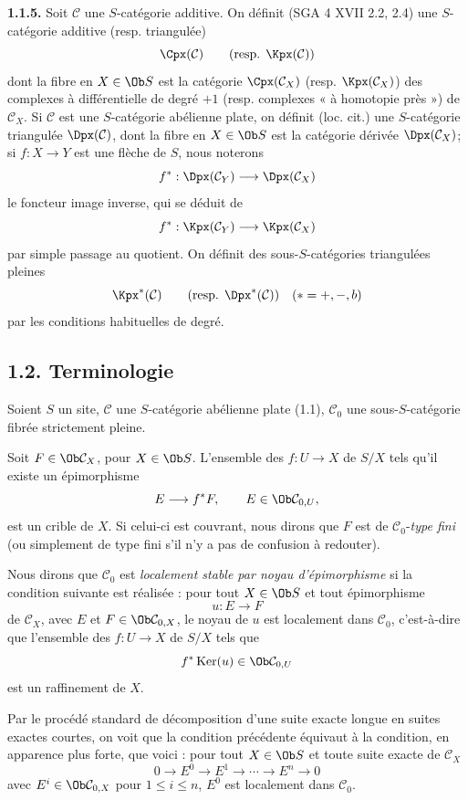 \documentclass[11pt]{article}
\providecommand{\Ker}{\operatorname{Ker}}
\begin{document}
\textbf{1.1.5.} Soit \(\mathcal C\) une \(S\)-catégorie additive. On définit (SGA 4 XVII 2.2, 2.4) une \(S\)-catégorie additive (resp. triangulée)
\[
  \Cpx(\mathcal C)\qquad\text{(resp. }\Kpx(\mathcal C)\text{)}
\]
dont la fibre en \(X\in\Ob S\) est la catégorie \(\Cpx(\mathcal C_X)\) (resp. \(\Kpx(\mathcal C_X)\)) des complexes à différentielle de degré \(+1\) (resp. complexes « à homotopie près ») de \(\mathcal C_X\). Si \(\mathcal C\) est une \(S\)-catégorie abélienne plate, on définit (loc. cit.) une \(S\)-catégorie triangulée \(\Dpx(\mathcal C)\), dont la fibre en \(X\in\Ob S\) est la catégorie dérivée \(\Dpx(\mathcal C_X)\); si \(f:X\to Y\) est une flèche de \(S\), nous noterons
\[
  f^*:\Dpx(\mathcal C_Y)\longrightarrow \Dpx(\mathcal C_X)
\]
le foncteur image inverse, qui se déduit de
\[
  f^*:\Kpx(\mathcal C_Y)\longrightarrow \Kpx(\mathcal C_X)
\]
par simple passage au quotient. On définit des sous-\(S\)-catégories triangulées pleines
\[
  \Kpx^*(\mathcal C)\qquad\text{(resp. }\Dpx^*(\mathcal C)\text{)}
  \quad (*=+,-,b)
\]
par les conditions habituelles de degré.

\subsection*{1.2. Terminologie}

Soient \(S\) un site, \(\mathcal C\) une \(S\)-catégorie abélienne plate (1.1), \(\mathcal C_0\) une sous-\(S\)-catégorie fibrée strictement pleine.

Soit \(F\in\Ob\mathcal C_X\), pour \(X\in\Ob S\). L'ensemble des \(f:U\to X\) de \(S/X\) tels qu'il existe un épimorphisme
\[
  E\longrightarrow f^*F,\qquad E\in\Ob\mathcal C_{0,U},
\]
est un crible de \(X\). Si celui-ci est couvrant, nous dirons que \(F\) est de \(\mathcal C_0\)-\emph{type fini} (ou simplement de type fini s'il n'y a pas de confusion à redouter).

Nous dirons que \(\mathcal C_0\) est \emph{localement stable par noyau d'épimorphisme} si la condition suivante est réalisée : pour tout \(X\in\Ob S\) et tout épimorphisme
\[
  u:E\longrightarrow F
\]
de \(\mathcal C_X\), avec \(E\) et \(F\in\Ob\mathcal C_{0,X}\), le noyau de \(u\) est localement dans \(\mathcal C_0\), c'est-à-dire que l'ensemble des \(f:U\to X\) de \(S/X\) tels que
\[
  f^*\Ker(u)\in\Ob\mathcal C_{0,U}
\]
est un raffinement de \(X\).

Par le procédé standard de décomposition d'une suite exacte longue en suites exactes courtes, on voit que la condition précédente équivaut à la condition, en apparence plus forte, que voici : pour tout \(X\in\Ob S\) et toute suite exacte de \(\mathcal C_X\)
\begin{equation}\tag{*}
  0\longrightarrow E^0\longrightarrow E^1\longrightarrow\cdots\longrightarrow E^n\longrightarrow 0
\end{equation}
avec \(E^i\in\Ob\mathcal C_{0,X}\) pour \(1\leq i\leq n\), \(E^0\) est localement dans \(\mathcal C_0\).
\end{document}
